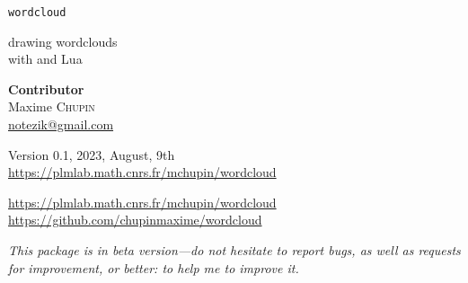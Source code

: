 \documentclass[english]{ltxdoc}
\begin{document}
\noindent
{\Huge \texttt{wordcloud}}\par\bigskip
\noindent
{\Large  drawing wordclouds \\[0.2cm]with  and Lua}\\[3cm]
\parbox{0.6\textwidth}{
}\hfill
\parbox{0.5\textwidth}{\Large\raggedleft
  \textbf{Contributor}\\
  Maxime \textsc{Chupin}\\
  \url{notezik@gmail.com}
}
\vfill
\begin{center}
  Version 0.1, 2023, August, 9th \\
  \url{https://plmlab.math.cnrs.fr/mchupin/wordcloud}
\end{center}
\newpage


\begin{abstract}
  These  and  packages allows drawing
  wordclouds from a list of words and weights. The algorithm is implemented with
   whereas Lua is used to parse \LaTeX{} commands, to build
  the list of words and weights from a text file, and to generate
   code interpreted by .
\end{abstract}


\begin{center}
  \url{https://plmlab.math.cnrs.fr/mchupin/wordcloud}
  \url{https://github.com/chupinmaxime/wordcloud}
\end{center}

\tableofcontents

\bigskip

\begin{tcolorbox}[ arc=0pt,outer arc=0pt,
  colback=darkred!3,
  colframe=darkred,
  breakable,
  boxsep=0pt,left=5pt,right=5pt,top=5pt,bottom=5pt, bottomtitle =
  3pt, toptitle=3pt,
  boxrule=0pt,bottomrule=0.5pt,toprule=0.5pt, toprule at break =
  0pt, bottomrule at break = 0pt,]
  \itshape
  This package is in beta version---do not hesitate to report bugs, as well as
  requests for improvement, or better: to help me to improve it. 
\end{tcolorbox}
\end{document}
